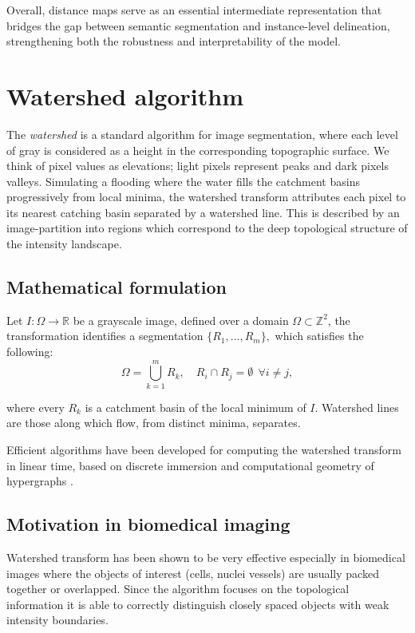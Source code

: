 \documentclass[target=bach,aauheader=,style=]{thud}
\begin{document}
Overall, distance maps serve as an essential intermediate representation that bridges the gap between semantic segmentation and instance-level delineation, strengthening both the robustness and interpretability of the model.
\section{Watershed algorithm}
The \emph{watershed} is a standard algorithm for image segmentation, where each level of gray is considered as a height in the corresponding topographic surface.
We think of pixel values as elevations; light pixels represent peaks and dark pixels valleys.
Simulating a flooding where the water fills the catchment basins progressively from local minima, the watershed transform attributes each pixel to its nearest catching basin separated by a watershed line.
This is described by an image-partition into regions which correspond to the deep topological structure of the intensity landscape.

\subsection{Mathematical formulation}
Let $I:\Omega \to \mathbb{R}$ be a grayscale image, defined over a domain $\Omega \subset \mathbb{Z}^2$, the transformation identifies a segmentation $\{R_1,..., R_m\},$ which satisfies the following:
\begin{equation}
    \Omega = \bigcup_{k=1}^m R_k, \quad R_i \cap R_j = \emptyset \ \ \forall i\neq j,
\end{equation}

where every $R_k$ is a catchment basin of the local minimum of $I$.
Watershed lines are those along which flow, from distinct minima, separates.

Efficient algorithms have been developed for computing the watershed transform in linear time, based on discrete immersion and computational geometry of hypergraphs \cite{beucher1992watershed}.

\subsection{Motivation in biomedical imaging}
Watershed transform has been shown to be very effective especially in biomedical images where the objects of interest (cells, nuclei vessels) are usually packed together or overlapped.
Since the algorithm focuses on the topological information it is able to correctly distinguish closely spaced objects with weak intensity boundaries.
\end{document}
